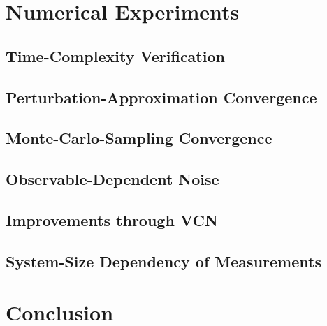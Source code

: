 \documentclass[
headings=optiontohead,              %
12pt,                               %
DIV=13,                             %
twoside=false,                      %
open=right,                         %
BCOR=00mm,                          %
toc=bibliographynumbered            %
]{scrreport}
\begin{document}
\chapter{Numerical Experiments}
\label{sec:numerical-experiments}

\FloatBarrier

    \section{Time-Complexity Verification}

    \section{Perturbation-Approximation Convergence}

    \section{Monte-Carlo-Sampling Convergence}

    \section{Observable-Dependent Noise}

    \section{Improvements through VCN}

    \section{System-Size Dependency of Measurements}

\chapter{Conclusion}
\label{sec:conclusion}

\FloatBarrier



\end{document}
